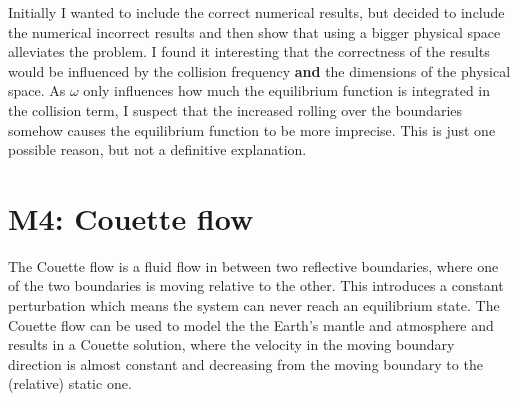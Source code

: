 \documentclass[a4paper,11pt, oneside]{book}
\begin{document}
Initially I wanted to include the correct numerical results, but decided to include the numerical incorrect results and then show that using a bigger physical space alleviates the problem.
I found it interesting that the correctness of the results would be influenced by the collision frequency \textbf{and} the dimensions of the physical space. 
As $\omega$ only influences how much the equilibrium function is integrated in the collision term, I suspect that the increased rolling over the boundaries somehow causes the equilibrium function to be more imprecise. 
This is just one possible reason, but not a definitive explanation.

\section{M4: Couette flow}
The Couette flow is a fluid flow in between two reflective boundaries, where one of the two boundaries is moving relative to the other. 
This introduces a constant perturbation which means the system can never reach an equilibrium state.
The Couette flow can be used to model the the Earth's mantle and atmosphere and results in a Couette solution, where the velocity in the moving boundary direction is almost constant and decreasing from the moving boundary to the (relative) static one.
\end{document}
